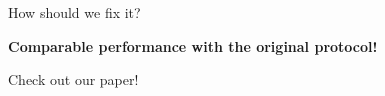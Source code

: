 \documentclass{purdue-poster}
\begin{document}
\begin{frame}{}
\begin{columns}[c]
\begin{column}{.45\linewidth}
\begin{block}{\large How should we fix it?}
\begin{itemize}
                \begin{figure}
                    {\centering}
                \end{figure}
                \textbf{Comparable performance with the original protocol!}
        \end{itemize}
    \end{block}
    \begin{block}{\large Check out our paper!}
        \begin{figure}
            {\centering}
        \end{figure}
    \end{block}
    \end{column}
    \end{columns}
    \vfill
\end{frame}
\end{document}
